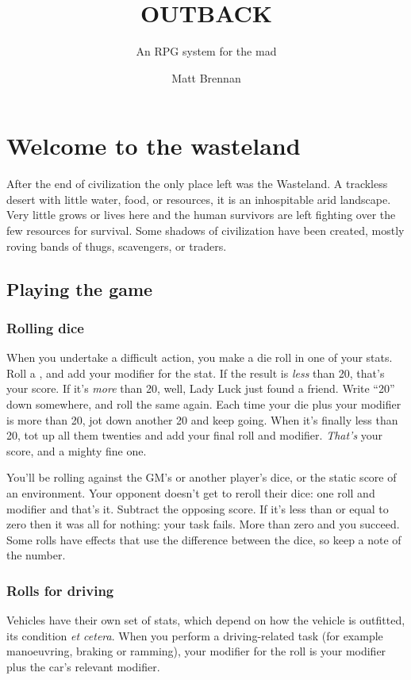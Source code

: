 \documentclass[10pt, a4paper, twocolumn]{book}
\title{\uppercase{Outback}}
\subtitle{An RPG system for the mad}
\author{Matt Brennan}
\date{}
\begin{document}
\frontmatter
\maketitle
\tableofcontents

\mainmatter
\chapter{Welcome to the wasteland}
After the end of civilization the only place left was the Wasteland. A trackless desert with little water, food, or resources, it is an inhospitable arid landscape. Very little grows or lives here and the human survivors are left fighting over the few resources for survival. Some shadows of civilization have been created, mostly roving bands of thugs, scavengers, or traders.
\section{Playing the game}
\subsection{Rolling dice}
When you undertake a difficult action, you make a die roll in one of your stats.
Roll a , and add your modifier for the stat. If the result is
\emph{less} than 20, that's your score. If it's \emph{more} than 20, well, Lady
Luck just found a friend. Write ``20'' down somewhere, and roll the same again. Each
time your die plus your modifier is more than 20, jot down another 20 and keep going.
When it's finally less than 20, tot up all them twenties and add your final roll
and modifier. \emph{That's} your score, and a mighty fine one.

You'll be rolling against the GM's or another player's dice, or the static score
of an environment. Your opponent doesn't get to reroll their dice: one roll and
modifier and that's it. Subtract the opposing score. If it's less than or equal
to zero then it was all for nothing: your task fails. More than zero and you
succeed. Some rolls have effects that use the difference between the dice, so
keep a note of the number.

\subsection{Rolls for driving}
Vehicles have their own set of stats, which depend on how the vehicle is
outfitted, its condition \emph{et cetera}. When you perform a driving-related
task (for example manoeuvring, braking or ramming), your modifier for the roll
is your  modifier plus the car's relevant modifier.
\end{document}

